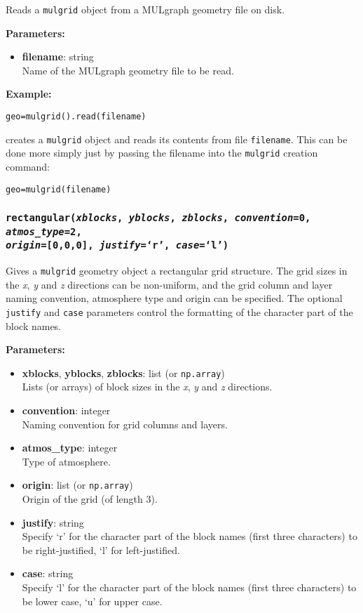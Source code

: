 Reads a \texttt{mulgrid} object from a MULgraph geometry file on disk.

\textbf{Parameters:}
\begin{itemize}
\item \textbf{filename}: string\\
  Name of the MULgraph geometry file to be read.
\end{itemize}

\textbf{Example:}

\begin{verbatim}
geo=mulgrid().read(filename)
\end{verbatim}

creates a \texttt{mulgrid} object and reads its contents from file \texttt{filename}.  This can be done more simply just by passing the filename into the \texttt{mulgrid} creation command:

\begin{verbatim}
geo=mulgrid(filename)
\end{verbatim}

\subsubsection{\texttt{rectangular(\emph{xblocks}, \emph{yblocks}, \emph{zblocks}, \emph{convention}=0, \emph{atmos\_type}=2,\\
    \emph{origin}=[0,0,0], \emph{justify}=`r', \emph{case}=`l')}}

Gives a \texttt{mulgrid} geometry object a rectangular grid structure.  The grid sizes in the \emph{x}, \emph{y} and \emph{z} directions can be non-uniform, and the grid column and layer naming convention, atmosphere type and origin can be specified.  The optional \texttt{justify} and \texttt{case} parameters control the formatting of the character part of the block names.

\textbf{Parameters:}
\begin{itemize}
\item \textbf{xblocks}, \textbf{yblocks}, \textbf{zblocks}: list (or \texttt{np.array})\\
  Lists (or arrays) of block sizes in the \emph{x}, \emph{y} and \emph{z} directions.
\item \textbf{convention}: integer\\
  Naming convention for grid columns and layers.
\item \textbf{atmos\_type}: integer\\
  Type of atmosphere.
\item \textbf{origin}: list (or \texttt{np.array})\\
  Origin of the grid (of length 3).
\item \textbf{justify}: string\\
  Specify `r' for the character part of the block names (first three characters) to be right-justified, `l' for left-justified.
\item \textbf{case}: string\\
  Specify `l' for the character part of the block names (first three characters) to be lower case, `u' for upper case.
\end{itemize}

